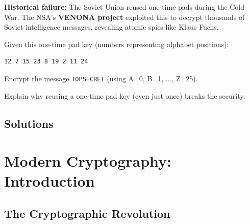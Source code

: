 \documentclass[11pt,a4paper]{report}
\begin{document}
\textbf{Historical failure:} The Soviet Union reused one-time pads during the Cold War. The NSA's \textbf{VENONA project} exploited this to decrypt thousands of Soviet intelligence messages, revealing atomic spies like Klaus Fuchs.

\begin{ex}
Given this one-time pad key (numbers representing alphabet positions):
\begin{verbatim}
12 7 15 23 8 19 2 11 24
\end{verbatim}
Encrypt the message \verb|TOPSECRET| (using A=0, B=1, ..., Z=25).
\end{ex}

\begin{ex}
Explain why reusing a one-time pad key (even just once) breaks the security.
\end{ex}

\newpage
\section{Solutions}
\printcursols

\newpage
\chapter{Modern Cryptography: Introduction}

\section{The Cryptographic Revolution}
\end{document}
